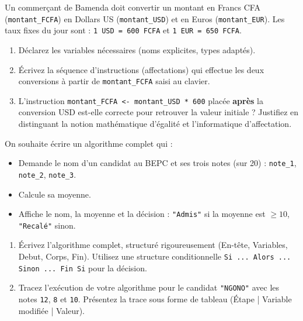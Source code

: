 \documentclass[11pt]{article}
\begin{document}
\begin{exercice}
Un commerçant de Bamenda doit convertir un montant en Francs CFA (\texttt{montant\_FCFA}) en Dollars US (\texttt{montant\_USD}) et en Euros (\texttt{montant\_EUR}). Les taux fixes du jour sont : \texttt{1 USD = 600 FCFA} et \texttt{1 EUR = 650 FCFA}.
\begin{enumerate}
    \item Déclarez les variables nécessaires (noms explicites, types adaptés).
    \item Écrivez la séquence d'instructions (affectations) qui effectue les deux conversions à partir de \texttt{montant\_FCFA} saisi au clavier.
    \item L'instruction \texttt{montant\_FCFA <- montant\_USD * 600} placée \textbf{après} la conversion USD est-elle correcte pour retrouver la valeur initiale ? Justifiez en distinguant la notion mathématique d'égalité et l'informatique d'affectation.
\end{enumerate}
\end{exercice}

\begin{exercice}
On souhaite écrire un algorithme complet qui :
\begin{itemize}
    \item Demande le nom d'un candidat au BEPC et ses trois notes (sur 20) : \texttt{note\_1}, \texttt{note\_2}, \texttt{note\_3}.
    \item Calcule sa moyenne.
    \item Affiche le nom, la moyenne et la décision : \texttt{"Admis"} si la moyenne est $\ge 10$, \texttt{"Recalé"} sinon.
\end{itemize}
\begin{enumerate}
    \item Écrivez l'algorithme complet, structuré rigoureusement (En-tête, Variables, Debut, Corps, Fin). Utilisez une structure conditionnelle \texttt{Si ... Alors ... Sinon ... Fin Si} pour la décision.
    \item Tracez l'exécution de votre algorithme pour le candidat \texttt{"NGONO"} avec les notes \texttt{12}, \texttt{8} et \texttt{10}. Présentez la trace sous forme de tableau (Étape | Variable modifiée | Valeur).
\end{enumerate}
\end{exercice}
\end{document}

